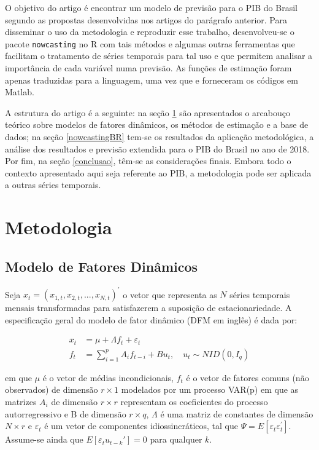 \documentclass{article}
\begin{document}
O objetivo do artigo é encontrar um modelo de previsão para o PIB do Brasil segundo as propostas desenvolvidas nos artigos do parágrafo anterior. Para disseminar o uso da metodologia e reproduzir esse trabalho, desenvolveu-se o pacote \texttt{nowcasting} no \textsf{R} com tais métodos e algumas outras ferramentas que facilitam o tratamento de séries temporais para tal uso e que permitem analisar a importância de cada variável numa previsão. As funções de estimação foram apenas traduzidas para a linguagem, uma vez que \cite{giannoneetal2008} e \cite{banburaetal2011} forneceram os códigos em \textsf{Matlab}.

A estrutura do artigo é a seguinte: na seção \ref{metodo} são apresentados o arcabouço teórico sobre modelos de fatores dinâmicos, os métodos de estimação e a base de dados; na seção \ref{nowcastingBR} tem-se os resultados da aplicação metodológica, a análise dos resultados e previsão extendida para o PIB do Brasil no ano de 2018. Por fim, na seção \ref{conclusao}, têm-se as considerações finais. Embora todo o contexto apresentado aqui seja referente ao PIB, a metodologia pode ser aplicada a outras séries temporais.

\section{Metodologia}\label{metodo}

\subsection{Modelo de Fatores Dinâmicos}\label{DFMmodel}

Seja $x_t = (x_{1,t},x_{2,t}, ..., x_{N,t})^{'}$ o vetor que representa as $N$ séries temporais mensais transformadas para satisfazerem a suposição de estacionariedade. A especificação geral do modelo de fator dinâmico (DFM em inglês) é dada por:

\begin{align}
x_t   &= \mu + \Lambda f_t + \varepsilon_t \label{eq_xt} \\
f_{t} &= \sum_{i=1}^{p} A_i f_{t-i} + B u_t, \quad u_t \sim NID(0,I_q) \label{eq_ft}
\end{align}

em que $\mu$ é o vetor de médias incondicionais, $f_t$ é o vetor de fatores comuns (não observados) de dimensão $r \times 1$ modelados por um processo VAR(p) em que as matrizes $A_i$ de dimensão $r \times r$ representam os coeficientes do processo autorregressivo e B de dimensão $r \times q$, $\Lambda$ é uma matriz de constantes de dimensão $N \times r$ e $\varepsilon_t$ é um vetor de componentes idiossincráticos, tal que $\Psi = E[\varepsilon_{t} \varepsilon^{'}_{t}]$. Assume-se ainda que $E[\varepsilon_t u_{t-k}'] = 0$ para qualquer $k$. %
\end{document}
